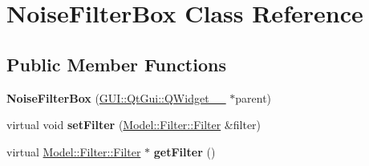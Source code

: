 \hypertarget{classGUI_1_1NoiseFilterBox}{}\section{Noise\+Filter\+Box Class Reference}
\label{classGUI_1_1NoiseFilterBox}
\subsection*{Public Member Functions}
\begin{DoxyCompactItemize}
\item 
\hypertarget{classGUI_1_1NoiseFilterBox_ad72bee39e6bcf5b241523aee68cb84c1}{}{\bfseries Noise\+Filter\+Box} (\hyperlink{classGUI_1_1QtGui_1_1QWidget____10}{G\+U\+I\+::\+Qt\+Gui\+::\+Q\+Widget\+\_\+\+\_} $\ast$parent)\label{classGUI_1_1NoiseFilterBox_ad72bee39e6bcf5b241523aee68cb84c1}

\item 
\hypertarget{classGUI_1_1NoiseFilterBox_ad7c0ee00fe3faac7942d75eec2a5342b}{}virtual void {\bfseries set\+Filter} (\hyperlink{classModel_1_1Filter_1_1Filter}{Model\+::\+Filter\+::\+Filter} \&filter)\label{classGUI_1_1NoiseFilterBox_ad7c0ee00fe3faac7942d75eec2a5342b}

\item 
\hypertarget{classGUI_1_1NoiseFilterBox_acef2029a93f4ab3a538cdb643b9c2613}{}virtual \hyperlink{classModel_1_1Filter_1_1Filter}{Model\+::\+Filter\+::\+Filter} $\ast$ {\bfseries get\+Filter} ()\label{classGUI_1_1NoiseFilterBox_acef2029a93f4ab3a538cdb643b9c2613}

\end{DoxyCompactItemize}
